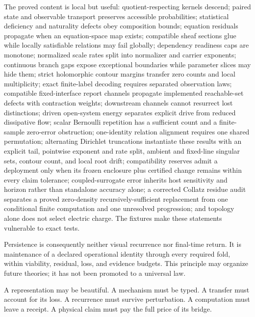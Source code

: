 \documentclass[11pt,a4paper]{article}
\theoremstyle{definition}
\theoremstyle{plain}
\theoremstyle{remark}
\begin{document}
The proved content is local but useful: quotient-respecting kernels descend;
paired state and observable transport preserves accessible probabilities;
statistical deficiency and naturality defects obey composition bounds;
equation residuals propagate when an equation-space map exists; compatible
sheaf sections glue while locally satisfiable relations may fail globally;
dependency readiness caps are monotone; normalized scale rates split into
normalizer and carrier exponents; continuous branch gaps expose exceptional
boundaries while parameter slices may hide them; strict holomorphic contour
margins transfer zero counts and local multiplicity; exact finite-label
decoding requires separated observation laws; compatible fixed-interface
report channels propagate implemented reachable-set defects with
contraction weights; downstream channels cannot resurrect lost distinctions;
driven open-system energy separates explicit drive from reduced dissipative
flow; scalar Bernoulli repetition has a sufficient count and a finite-sample
zero-error obstruction; one-identity relation alignment requires one shared
permutation; alternating Dirichlet
truncations instantiate these results with an explicit tail, pointwise
exponent and rate split, ambient and fixed-line singular sets, contour count,
and local root drift; compatibility reserves admit a deployment only when its
frozen enclosure plus certified change remains within every claim tolerance;
coupled-surrogate error inherits host sensitivity and horizon rather than
standalone accuracy alone; a corrected Collatz residue audit separates a
proved zero-density recursively-sufficient replacement from one conditional
finite computation and one unresolved progression; and
topology alone does not select electric charge.  The fixtures make these
statements vulnerable to exact tests.

Persistence is consequently neither visual recurrence nor final-time return.
It is maintenance of a declared operational identity through every required
fold, within viability, residual, loss, and evidence budgets.  This principle
may organize future theories; it has not been promoted to a universal law.

A representation may be beautiful.  A mechanism must be typed.  A transfer
must account for its loss.  A recurrence must survive perturbation.  A
computation must leave a receipt.  A physical claim must pay the full price of
its bridge.



\end{document}

